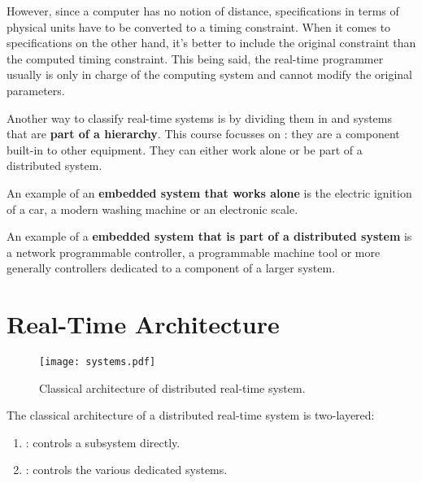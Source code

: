 \documentclass[../main.tex]{subfiles}
\begin{document}
However, since a computer has no notion of distance, specifications in terms of physical units have to be converted to a timing constraint.
When it comes to specifications on the other hand, it's better to include the original constraint than the computed timing constraint.
This being said, the real-time programmer usually is only in charge of the computing system and cannot modify the original parameters.

Another way to classify real-time systems is by dividing them in  and systems that are \textbf{part of a hierarchy}. This course focusses on : they are a component built-in to other equipment. They can either work alone or be part of a distributed system.

\begin{exmp}
An example of an \textbf{embedded system that works alone} is the electric ignition of a car, a modern washing machine or an electronic scale.
\end{exmp}

\begin{exmp}
An example of a \textbf{embedded system that is part of a distributed system} is a network programmable controller, a programmable machine tool or more generally controllers dedicated to a component of a larger system.
\end{exmp}


\section{Real-Time Architecture}
\begin{figure}[H]
    \centering
    \texttt{[image: systems.pdf]}
    \caption{Classical architecture of distributed real-time system.}
    \label{systems}
\end{figure}
The classical architecture of a distributed real-time system is two-layered:
\begin{enumerate}
	\item {}: controls a subsystem directly.
	\item {}: controls the various dedicated systems.
\end{enumerate}
\end{document}
